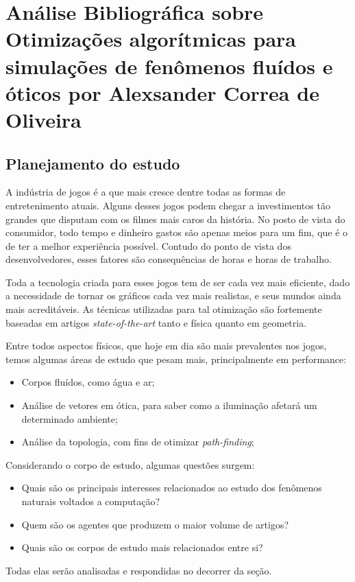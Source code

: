 \chapter{Análise Bibliográfica sobre Otimizações algorítmicas para simulações de fenômenos fluídos e óticos por Alexsander Correa de Oliveira}

\section{Planejamento do estudo}
    A indústria de jogos é a que mais cresce dentre todas as formas de entretenimento atuais. Alguns desses jogos podem chegar a investimentos tão grandes que disputam com os filmes mais caros da história. No posto de vista do consumidor, todo tempo e dinheiro gastos são apenas meios para um fim, que é o de ter a melhor experiência possível. Contudo do ponto de vista dos desenvolvedores, esses fatores são consequências de horas e horas de trabalho.
    
    Toda a tecnologia criada para esses jogos tem de ser cada vez mais eficiente, dado a necessidade de tornar os gráficos cada vez mais realistas, e seus mundos ainda mais acreditáveis. As técnicas utilizadas para tal otimização são fortemente baseadas em artigos \emph{state-of-the-art} tanto e física quanto em geometria.
    
    Entre todos aspectos físicos, que hoje em dia são mais prevalentes nos jogos, temos algumas áreas de estudo que pesam mais, principalmente em performance: 
    \begin{itemize}
        \item Corpos fluídos, como água e ar;
        \item Análise de vetores em ótica, para saber como a iluminação afetará um determinado ambiente;
        \item Análise da topologia, com fins de otimizar \emph{path-finding};
    \end{itemize}
    
    Considerando o corpo de estudo, algumas questões surgem:
    \begin{itemize}
        \item Quais são os principais interesses relacionados ao estudo dos fenômenos naturais voltados a computação?
        \item Quem são os agentes que produzem o maior volume de artigos?
        \item Quais são os corpos de estudo mais relacionados entre si?
    \end{itemize}
    Todas elas serão analisadas e respondidas no decorrer da seção.
